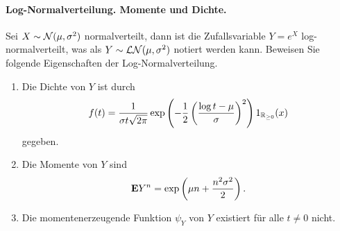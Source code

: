 \paragraph{Log-Normalverteilung. Momente und Dichte.}
Sei $X \sim \mathcal N(\mu,\sigma^2)$ normalverteilt, dann ist die Zufallsvariable 
$Y = e^{X}$ log-normalverteilt, was als $Y \sim \mathcal L\mathcal N (\mu, \sigma^2)$ notiert 
werden kann. Beweisen Sie folgende Eigenschaften der Log-Normalverteilung.
\begin{enumerate}
    \item Die Dichte von $Y$ ist durch
        \begin{equation*}
            f(t) = \frac{1}{\sigma t\sqrt{2\pi}} 
            \exp \left( -\frac{1}{2} \left( \frac{\log t -\mu}{\sigma} \right)^2  \right)
            1_{\mathbb R_{\geq 0}}(x) 
        \end{equation*} 
        gegeben.
    \item Die Momente von $Y$ sind 
        \begin{equation*}
            \mathbf{E} Y^n = \exp \left( \mu n + \frac{n^2\sigma^2}{2} \right).
        \end{equation*}
    \item Die momentenerzeugende Funktion $\psi_Y$ von $Y$ existiert für alle $t\neq 0$ nicht. 
\end{enumerate}
